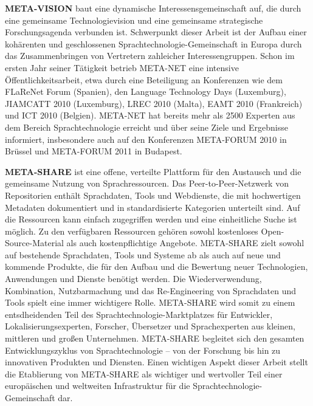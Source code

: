 \documentclass[]{../../metanetpaper}
\begin{document}
\begin{multicols}{2}
\textbf{META-VISION} baut eine dynamische Interessensgemeinschaft auf, die durch eine gemeinsame Technologievision und eine gemeinsame strategische For\-schungs\-a\-gen\-da verbunden ist. Schwerpunkt dieser Arbeit ist der Aufbau einer kohärenten und geschlossenen Sprach\-tech\-no\-lo\-gie-Ge\-mein\-schaft in Europa durch das Zusammenbringen von Vertretern zahleicher Interessengruppen. Schon im ersten Jahr seiner Tätigkeit betrieb META-NET eine intensive Öffentlichkeitsarbeit, etwa durch eine Beteiligung an Konferenzen wie dem FLaReNet Forum (Spanien), den Language Technology Days (Luxemburg), JIAMCATT 2010 (Luxemburg), LREC 2010 (Malta), EAMT 2010 (Frankreich) und ICT 2010 (Belgien). META-NET hat bereits mehr als 2500 Experten aus dem Bereich Sprachtechnologie erreicht und über seine Ziele und Ergebnisse informiert, insbesondere auch auf den Konferenzen META-FORUM 2010 in Brüssel und META-FORUM 2011 in Budapest.

\textbf{META-SHARE} ist eine offene, verteilte Plattform für den Austausch und die gemeinsame Nutzung von Sprachressourcen. Das Peer-to-Peer-Netzwerk von Repositorien enthält Sprachdaten, Tools und Webdienste, die mit hochwertigen Metadaten dokumentiert und in standardisierte Kategorien unterteilt sind. Auf die Ressourcen kann einfach zugegriffen werden und eine einheitliche Suche ist möglich. Zu den verfügbaren Ressourcen gehören sowohl kostenloses Open-Source-Material als auch  kostenpflichtige Angebote. META-SHARE zielt sowohl auf bestehende Sprachdaten, Tools und Systeme ab als auch auf neue und kommende Produkte, die für den Aufbau und die Bewertung neuer Technologien, Anwendungen und Dienste benötigt werden. Die Wiederverwendung, Kombination, Nutzbarmachung und das Re-Engineering von Sprachdaten und Tools spielt eine immer wichtigere Rolle. META-SHARE wird somit zu einem entsdheidenden Teil des Sprachtechnologie-Marktplatzes für Entwickler, Lokalisierungsexperten, Forscher, Übersetzer und Sprachexperten aus kleinen, mittleren und großen Unternehmen. META-SHARE begleitet sich den gesamten Entwicklungszyklus von Sprachtechnologie – von der Forschung bis hin zu innovativen Produkten und Diensten. Einen wichtigen Aspekt dieser Arbeit stellt die Etablierung von META-SHARE als wichtiger und wertvoller Teil einer europäischen und weltweiten Infrastruktur für die Sprachtechnologie-Gemeinschaft dar.


\end{multicols}
\end{document}
